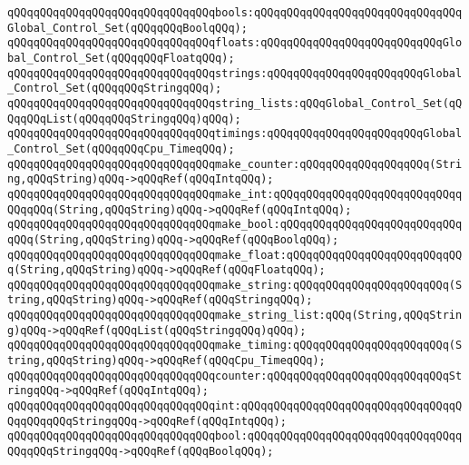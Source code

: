 \verb|qQQqqQQqqQQqqQQqqQQqqQQqqQQqqQQqbools:qQQqqQQqqQQqqQQqqQQqqQQqqQQqqQQqGlobal_Control_Set(qQQqqQQqBoolqQQq);|\newline
\verb|qQQqqQQqqQQqqQQqqQQqqQQqqQQqqQQqfloats:qQQqqQQqqQQqqQQqqQQqqQQqqQQqGlobal_Control_Set(qQQqqQQqFloatqQQq);|\newline
\verb|qQQqqQQqqQQqqQQqqQQqqQQqqQQqqQQqstrings:qQQqqQQqqQQqqQQqqQQqqQQqGlobal_Control_Set(qQQqqQQqStringqQQq);|\newline
\verb|qQQqqQQqqQQqqQQqqQQqqQQqqQQqqQQqstring_lists:qQQqGlobal_Control_Set(qQQqqQQqList(qQQqqQQqStringqQQq)qQQq);|\newline
\verb|qQQqqQQqqQQqqQQqqQQqqQQqqQQqqQQqtimings:qQQqqQQqqQQqqQQqqQQqqQQqGlobal_Control_Set(qQQqqQQqCpu_TimeqQQq);|\newline
\newline
\verb|qQQqqQQqqQQqqQQqqQQqqQQqqQQqqQQqmake_counter:qQQqqQQqqQQqqQQqqQQq(String,qQQqString)qQQq->qQQqRef(qQQqIntqQQq);|\newline
\verb|qQQqqQQqqQQqqQQqqQQqqQQqqQQqqQQqmake_int:qQQqqQQqqQQqqQQqqQQqqQQqqQQqqQQqqQQq(String,qQQqString)qQQq->qQQqRef(qQQqIntqQQq);|\newline
\verb|qQQqqQQqqQQqqQQqqQQqqQQqqQQqqQQqmake_bool:qQQqqQQqqQQqqQQqqQQqqQQqqQQqqQQq(String,qQQqString)qQQq->qQQqRef(qQQqBoolqQQq);|\newline
\verb|qQQqqQQqqQQqqQQqqQQqqQQqqQQqqQQqmake_float:qQQqqQQqqQQqqQQqqQQqqQQqqQQq(String,qQQqString)qQQq->qQQqRef(qQQqFloatqQQq);|\newline
\verb|qQQqqQQqqQQqqQQqqQQqqQQqqQQqqQQqmake_string:qQQqqQQqqQQqqQQqqQQqqQQq(String,qQQqString)qQQq->qQQqRef(qQQqStringqQQq);|\newline
\verb|qQQqqQQqqQQqqQQqqQQqqQQqqQQqqQQqmake_string_list:qQQq(String,qQQqString)qQQq->qQQqRef(qQQqList(qQQqStringqQQq)qQQq);|\newline
\verb|qQQqqQQqqQQqqQQqqQQqqQQqqQQqqQQqmake_timing:qQQqqQQqqQQqqQQqqQQqqQQq(String,qQQqString)qQQq->qQQqRef(qQQqCpu_TimeqQQq);|\newline
\newline
\verb|qQQqqQQqqQQqqQQqqQQqqQQqqQQqqQQqcounter:qQQqqQQqqQQqqQQqqQQqqQQqqQQqStringqQQq->qQQqRef(qQQqIntqQQq);|\newline
\verb|qQQqqQQqqQQqqQQqqQQqqQQqqQQqqQQqint:qQQqqQQqqQQqqQQqqQQqqQQqqQQqqQQqqQQqqQQqqQQqStringqQQq->qQQqRef(qQQqIntqQQq);|\newline
\verb|qQQqqQQqqQQqqQQqqQQqqQQqqQQqqQQqbool:qQQqqQQqqQQqqQQqqQQqqQQqqQQqqQQqqQQqqQQqStringqQQq->qQQqRef(qQQqBoolqQQq);|\newline
